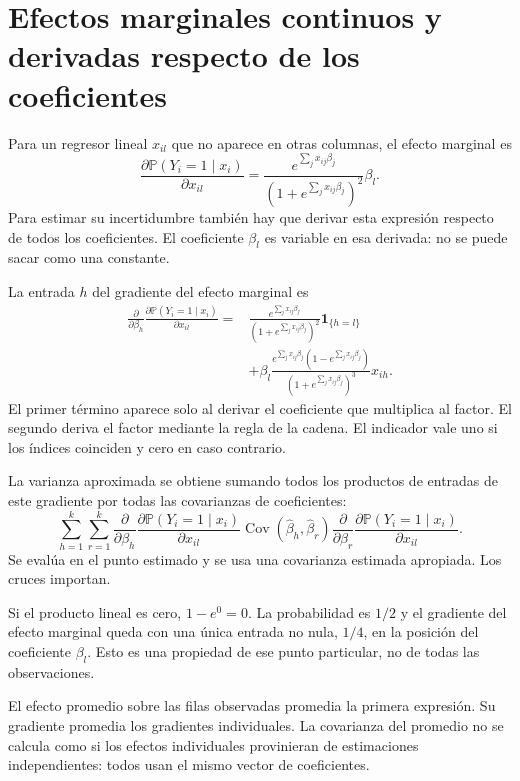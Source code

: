 \documentclass[11pt,a4paper]{article}
\newcommand{\Prob}{\mathbb P}
\DeclareMathOperator{\Cov}{Cov}
\begin{document}
\clearpage
\section{Efectos marginales continuos y derivadas respecto de los coeficientes}\label{logit62}
Para un regresor lineal $x_{il}$ que no aparece en otras
columnas, el efecto marginal es
\[
\frac{\partial\Prob(Y_i=1\mid x_i)}{\partial x_{il}}
=
\frac{e^{\sum_jx_{ij}\beta_j}}
{(1+e^{\sum_jx_{ij}\beta_j})^2}\beta_l.
\]
Para estimar su incertidumbre también hay que derivar
esta expresión respecto de todos los coeficientes.
El coeficiente $\beta_l$ es variable en esa derivada:
no se puede sacar como una constante.

La entrada $h$ del gradiente del efecto marginal es
\[
\begin{aligned}
\frac{\partial}{\partial\beta_h}
\frac{\partial\Prob(Y_i=1\mid x_i)}{\partial x_{il}}
={}&\frac{e^{\sum_jx_{ij}\beta_j}}
{(1+e^{\sum_jx_{ij}\beta_j})^2}\mathbf1_{\{h=l\}}\\
&+\beta_l
\frac{e^{\sum_jx_{ij}\beta_j}(1-e^{\sum_jx_{ij}\beta_j})}
{(1+e^{\sum_jx_{ij}\beta_j})^3}x_{ih}.
\end{aligned}
\]
El primer término aparece solo al derivar el coeficiente
que multiplica al factor. El segundo deriva el factor
mediante la regla de la cadena.
El indicador vale uno si los índices coinciden y cero
en caso contrario.

La varianza aproximada se obtiene sumando todos los
productos de entradas de este gradiente por todas las
covarianzas de coeficientes:
\[
\sum_{h=1}^k\sum_{r=1}^k
\frac{\partial}{\partial\beta_h}
\frac{\partial\Prob(Y_i=1\mid x_i)}{\partial x_{il}}
\Cov(\widehat\beta_h,\widehat\beta_r)
\frac{\partial}{\partial\beta_r}
\frac{\partial\Prob(Y_i=1\mid x_i)}{\partial x_{il}}.
\]
Se evalúa en el punto estimado y se usa una covarianza
estimada apropiada. Los cruces importan.

\begin{ejemplo}
Si el producto lineal es cero, $1-e^0=0$.
La probabilidad es $1/2$ y el gradiente del efecto
marginal queda con una única entrada no nula, $1/4$,
en la posición del coeficiente $\beta_l$.
Esto es una propiedad de ese punto particular,
no de todas las observaciones.
\end{ejemplo}
El efecto promedio sobre las filas observadas promedia
la primera expresión.
Su gradiente promedia los gradientes individuales.
La covarianza del promedio no se calcula como si los
efectos individuales provinieran de estimaciones independientes:
todos usan el mismo vector de coeficientes.
\end{document}
